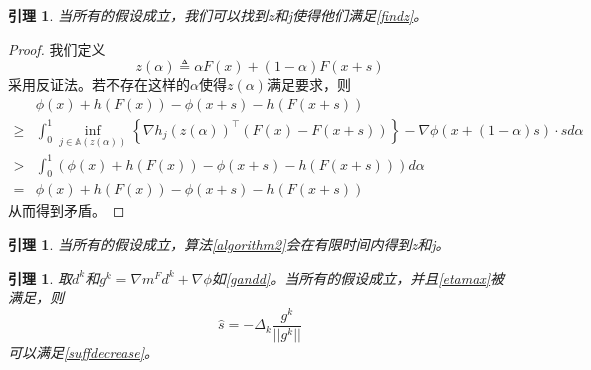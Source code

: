 \documentclass[macfonts]{njuthesis}
\newtheorem{lem}[thm]{引理}
\begin{document}
\begin{lem}
\label{canfindz}
当所有的假设成立，我们可以找到z和j使得他们满足\ref{findz}。

\end{lem}
\begin{proof}
我们定义$$
z(\alpha) \triangleq \alpha F(x)+(1-\alpha) F(x+s)
$$
采用反证法。若不存在这样的$\alpha$使得$z(\alpha)$满足要求，则
$$
\begin{aligned}
&\phi(x)+h(F(x))-\phi(x+s)-h(F(x+s))\\  \geq &\int_{0}^{1} \inf _{j \in \mathbb{A}(z(\alpha))}\left\{\nabla h_{j}(z(\alpha))^{\top}(F(x)-F(x+s))\right\} -\nabla\phi(x+(1-\alpha) s)\cdot s d \alpha \\
>&\int_{0}^{1}(\phi(x)+h(F(x))-\phi(x+s)-h(F(x+s))) d \alpha\\
=&\phi(x)+h(F(x))-\phi(x+s)-h(F(x+s)) 
\end{aligned}
$$
从而得到矛盾。
\end{proof}
\begin{lem}
\label{algorithmcanfindz}
当所有的假设成立，算法\ref{algorithm2}会在有限时间内得到z和j。
\end{lem}


\begin{lem}
\label{gets}
取$d^k$和$g^k=\nabla m^Fd^k +\nabla\phi$如\ref{gandd}。当所有的假设成立，并且\ref{etamax}被满足，则
$$
\hat{s}=-\Delta_k\frac{g^k}{||g^k||} 
$$
可以满足\ref{suffdecrease}。
\end{lem}
\end{document}
